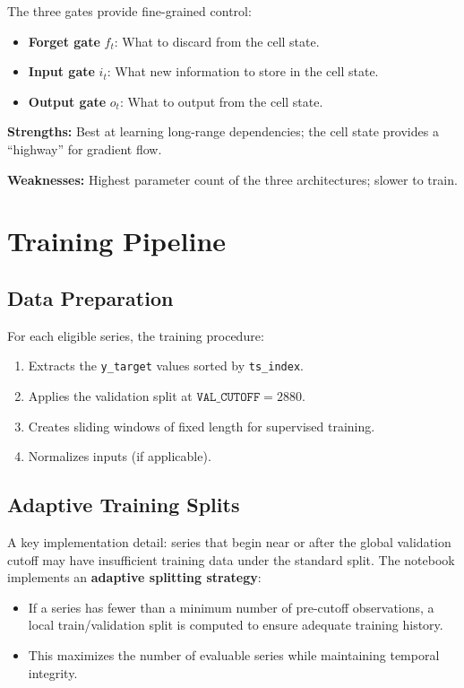 The three gates provide fine-grained control:
\begin{itemize}
    \item \textbf{Forget gate} $f_t$: What to discard from the cell state.
    \item \textbf{Input gate} $i_t$: What new information to store in the cell state.
    \item \textbf{Output gate} $o_t$: What to output from the cell state.
\end{itemize}

\textbf{Strengths:} Best at learning long-range dependencies; the cell state provides a ``highway'' for gradient flow.

\textbf{Weaknesses:} Highest parameter count of the three architectures; slower to train.

\section{Training Pipeline}

\subsection{Data Preparation}

For each eligible series, the training procedure:

\begin{enumerate}
    \item Extracts the \texttt{y\_target} values sorted by \texttt{ts\_index}.
    \item Applies the validation split at $\texttt{VAL\_CUTOFF} = 2880$.
    \item Creates sliding windows of fixed length for supervised training.
    \item Normalizes inputs (if applicable).
\end{enumerate}

\subsection{Adaptive Training Splits}

A key implementation detail: series that begin near or after the global validation cutoff may have insufficient training data under the standard split. The notebook implements an \textbf{adaptive splitting strategy}:

\begin{itemize}
    \item If a series has fewer than a minimum number of pre-cutoff observations, a local train/validation split is computed to ensure adequate training history.
    \item This maximizes the number of evaluable series while maintaining temporal integrity.
\end{itemize}

